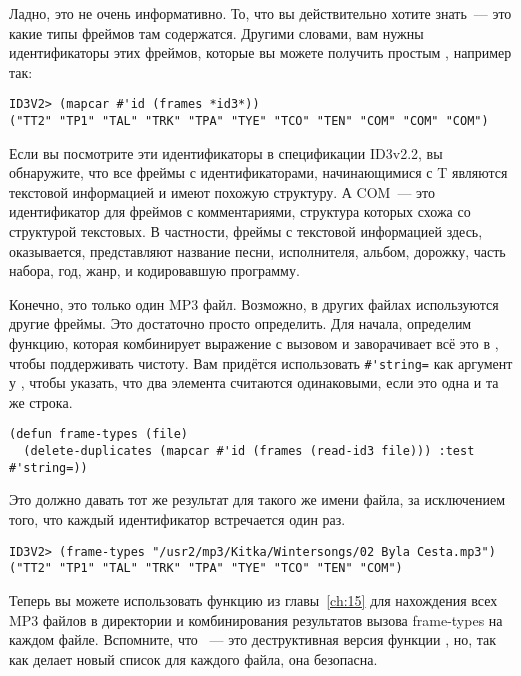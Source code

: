 Ладно, это не очень информативно. То, что вы действительно хотите знать~--- это какие типы
фреймов там содержатся. Другими словами, вам нужны идентификаторы этих фреймов, которые вы
можете получить простым , например так:

\begin{lstlisting}
ID3V2> (mapcar #'id (frames *id3*))
("TT2" "TP1" "TAL" "TRK" "TPA" "TYE" "TCO" "TEN" "COM" "COM" "COM")
\end{lstlisting}

Если вы посмотрите эти идентификаторы в спецификации ID3v2.2, вы обнаружите, что все
фреймы с идентификаторами, начинающимися с T являются текстовой информацией и имеют
похожую структуру. А COM~--- это идентификатор для фреймов с комментариями, структура
которых схожа со структурой текстовых. В частности, фреймы с текстовой информацией здесь,
оказывается, представляют название песни, исполнителя, альбом, дорожку, часть набора, год,
жанр, и кодировавшую программу.

Конечно, это только один MP3 файл. Возможно, в других файлах используются другие
фреймы. Это достаточно просто определить. Для начала, определим функцию, которая
комбинирует выражение  с вызовом  и заворачивает всё это в
, чтобы поддерживать чистоту. Вам придётся использовать
\lstinline!#'string=! как аргумент  у , чтобы указать,
что два элемента считаются одинаковыми, если это одна и та же строка.

\begin{lstlisting}
(defun frame-types (file)
  (delete-duplicates (mapcar #'id (frames (read-id3 file))) :test #'string=))
\end{lstlisting}

Это должно давать тот же результат для такого же имени файла, за исключением того, что
каждый идентификатор встречается один раз.

\begin{lstlisting}
ID3V2> (frame-types "/usr2/mp3/Kitka/Wintersongs/02 Byla Cesta.mp3")
("TT2" "TP1" "TAL" "TRK" "TPA" "TYE" "TCO" "TEN" "COM")
\end{lstlisting}

Теперь вы можете использовать функцию  из главы~\ref{ch:15} для
нахождения всех MP3 файлов в директории и комбинирования результатов вызова frame-types на
каждом файле. Вспомните, что ~--- это деструктивная версия функции
, но, так как  делает новый список для каждого файла, она
безопасна.


